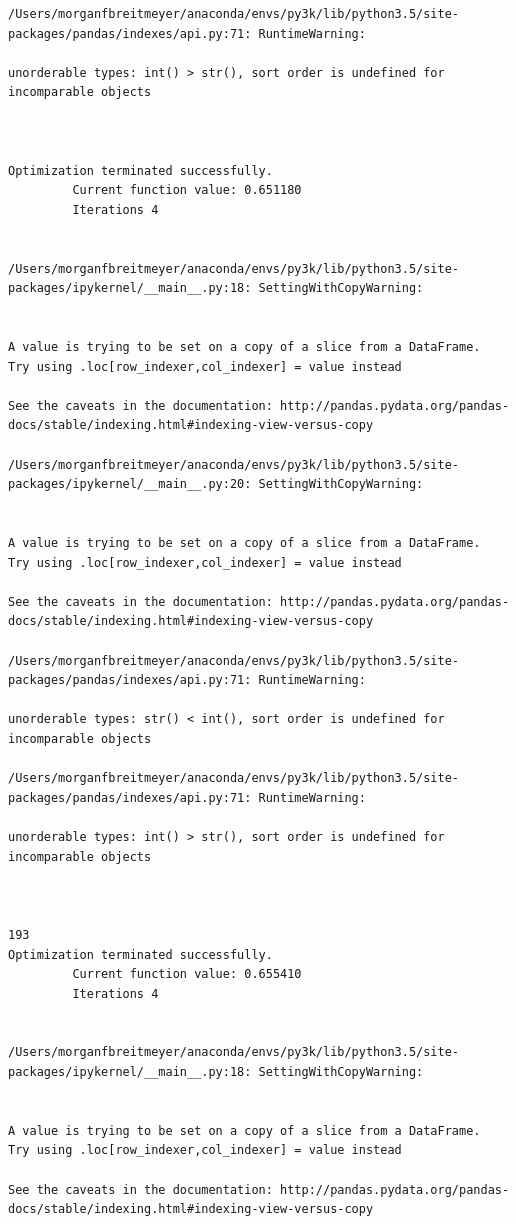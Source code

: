 \begin{lstlisting}
/Users/morganfbreitmeyer/anaconda/envs/py3k/lib/python3.5/site-packages/pandas/indexes/api.py:71: RuntimeWarning:

unorderable types: int() > str(), sort order is undefined for incomparable objects



Optimization terminated successfully.
         Current function value: 0.651180
         Iterations 4


/Users/morganfbreitmeyer/anaconda/envs/py3k/lib/python3.5/site-packages/ipykernel/__main__.py:18: SettingWithCopyWarning:


A value is trying to be set on a copy of a slice from a DataFrame.
Try using .loc[row_indexer,col_indexer] = value instead

See the caveats in the documentation: http://pandas.pydata.org/pandas-docs/stable/indexing.html#indexing-view-versus-copy

/Users/morganfbreitmeyer/anaconda/envs/py3k/lib/python3.5/site-packages/ipykernel/__main__.py:20: SettingWithCopyWarning:


A value is trying to be set on a copy of a slice from a DataFrame.
Try using .loc[row_indexer,col_indexer] = value instead

See the caveats in the documentation: http://pandas.pydata.org/pandas-docs/stable/indexing.html#indexing-view-versus-copy

/Users/morganfbreitmeyer/anaconda/envs/py3k/lib/python3.5/site-packages/pandas/indexes/api.py:71: RuntimeWarning:

unorderable types: str() < int(), sort order is undefined for incomparable objects

/Users/morganfbreitmeyer/anaconda/envs/py3k/lib/python3.5/site-packages/pandas/indexes/api.py:71: RuntimeWarning:

unorderable types: int() > str(), sort order is undefined for incomparable objects



193
Optimization terminated successfully.
         Current function value: 0.655410
         Iterations 4


/Users/morganfbreitmeyer/anaconda/envs/py3k/lib/python3.5/site-packages/ipykernel/__main__.py:18: SettingWithCopyWarning:


A value is trying to be set on a copy of a slice from a DataFrame.
Try using .loc[row_indexer,col_indexer] = value instead

See the caveats in the documentation: http://pandas.pydata.org/pandas-docs/stable/indexing.html#indexing-view-versus-copy


\end{lstlisting}
